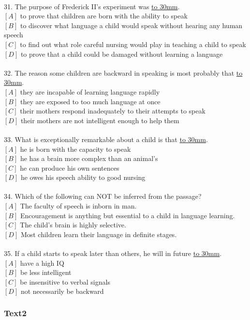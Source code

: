 \documentclass[a4paper]{article}
\begin{document}
\\31.	The purpose of Frederick II’s experiment was \underline{\hbox to 30mm{}}.\\$[A]$ to prove that children are born with the ability to speak\\$[B]$ to discover what language a child would speak without hearing any human speech\\$[C]$ to find out what role careful nursing would play in teaching a child to speak\\$[D]$ to prove that a child could be damaged without learning a language\\\\32.	The reason some children are backward in speaking is most probably that \underline{\hbox to 30mm{}}.\\$[A]$ they are incapable of learning language rapidly\\$[B]$ they are exposed to too much language at once\\$[C]$ their mothers respond inadequately to their attempts to speak\\$[D]$ their mothers are not intelligent enough to help them\\\\33.	What is exceptionally remarkable about a child is that \underline{\hbox to 30mm{}}.\\$[A]$ he is born with the capacity to speak\\$[B]$ he has a brain more complex than an animal’s\\$[C]$ he can produce his own sentences\\$[D]$ he owes his speech ability to good nursing\\\\34.	Which of the following can NOT be inferred from the passage?\\$[A]$ The faculty of speech is inborn in man.\\$[B]$ Encouragement is anything but essential to a child in language learning.\\$[C]$ The child’s brain is highly selective.\\$[D]$ Most children learn their language in definite stages.\\\\35.	If a child starts to speak later than others, he will in future \underline{\hbox to 30mm{}}.\\$[A]$ have a high IQ\\$[B]$ be less intelligent\\$[C]$ be insensitive to verbal signals\\$[D]$ not necessarily be backward\\\subsubsection{Text2}
\end{document}
